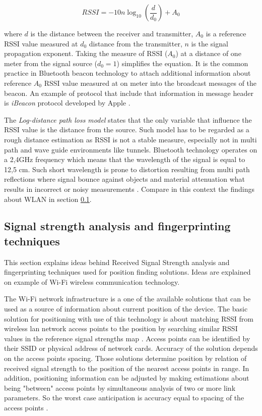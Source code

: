 \documentclass[../main.tex]{subfiles}
\begin{document}
\begin{equation}
\label{eq:log-distance-model}
	RSSI = -10 n \log_{10} (\frac{d}{d_0}) + A_0
\end{equation}

where $ d $ is the distance between the receiver and transmitter, $A_0$ is a reference RSSI value measured at $d_0$ distance from the transmitter, $n$ is the signal propagation exponent. Taking the measure of RSSI ($A_0$) at a distance of one meter from the signal source ($d_0 = 1$) simplifies the equation. It is the common practice in Bluetooth beacon technology to attach additional information about reference $A_0$ RSSI value measured at on meter into the broadcast messages of the beacon. An example of protocol that include that information in message header is \textit{iBeacon} protocol developed by Apple \cite{beacons_ble_evaluation}.

The \textit{Log-distance path loss model} states that the only variable that influence the RSSI value is the distance from the source. Such model has to be regarded as a rough distance estimation as RSSI is not a stable measure, especially not in multi path and wave guide environments like tunnels. Bluetooth technology operates on a 2,4GHz frequency which means that the wavelength of the signal is equal to 12,5 cm. Such short wavelength is prone to distortion resulting from multi path reflections where signal bounce against objects and material attenuation what results in incorrect or noisy measurements \cite{RSSI_path_loss_prediction_model}. Compare in this context the findings about WLAN in section \ref{sub:wifi_fingerprinting}.


\subsection{Signal strength analysis and fingerprinting techniques} %
\label{sub:wifi_fingerprinting}

This section explains ideas behind Received Signal Strength analysis and fingerprinting techniques used for position finding solutions. Ideas are explained on example of Wi-Fi wireless communication technology.

The Wi-Fi network infrastructure is a one of the available solutions that can be used as a source of information about current position of the device. The basic solution for positioning with use of this technology is about matching RSSI from wireless lan network access points to the position by searching similar RSSI values in the reference signal strengths map \cite{WLAN_fingerprinting}. Access points can be identified by their SSID or physical address of network cards. Accuracy of the solution depends on the access points spacing. Those solutions determine position by relation of received signal strength to the position of the nearest access points in range. In addition, positioning information can be adjusted by making estimations about being "between" access points by simultaneous analysis of two or more link parameters. So the worst case anticipation is accuracy equal to spacing of the access points \cite{Thesis_CM}\cite{thesis_tablet_positioning}.
\end{document}
